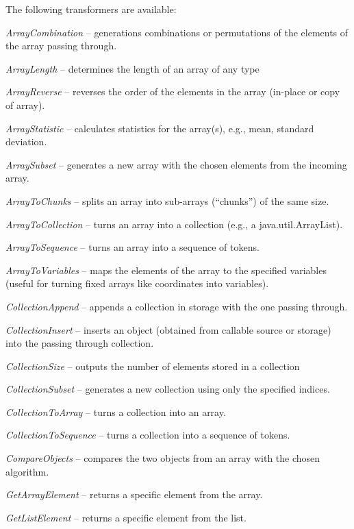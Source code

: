 \noindent The following transformers are available:
\begin{tight_itemize}
	\item \textit{ArrayCombination} -- generations combinations or permutations of
	the elements of the array passing through.
	\item \textit{ArrayLength} -- determines the length of an array of any type
	\item \textit{ArrayReverse} -- reverses the order of the elements in the array
	(in-place or copy of array).
	\item \textit{ArrayStatistic} -- calculates statistics for the array(s), e.g.,
	mean, standard deviation.
	\item \textit{ArraySubset} -- generates a new array with the chosen elements
	from the incoming array.
	\item \textit{ArrayToChunks} -- splits an array into sub-arrays (``chunks'')
	of the same size.
	\item \textit{ArrayToCollection} -- turns an array into a collection (e.g.,
	a java.util.ArrayList).
	\item \textit{ArrayToSequence} -- turns an array into a sequence of tokens.
	\item \textit{ArrayToVariables} -- maps the elements of the array to the
	specified variables (useful for turning fixed arrays like coordinates into variables).
	\item \textit{CollectionAppend} -- appends a collection in storage with the
	one passing through.
	\item \textit{CollectionInsert} -- inserts an object (obtained from callable
	source or storage) into the passing through collection.
  \item \textit{CollectionSize} -- outputs the number of elements stored in a collection
	\item \textit{CollectionSubset} -- generates a new collection using only the
	specified indices.
	\item \textit{CollectionToArray} -- turns a collection into an array.
	\item \textit{CollectionToSequence} -- turns a collection into a sequence of
	tokens.
	\item \textit{CompareObjects} -- compares the two objects from an array
	with the chosen algorithm.
	\item \textit{GetArrayElement} -- returns a specific element from the array.
	\item \textit{GetListElement} -- returns a specific element from the list.

\end{tight_itemize}
